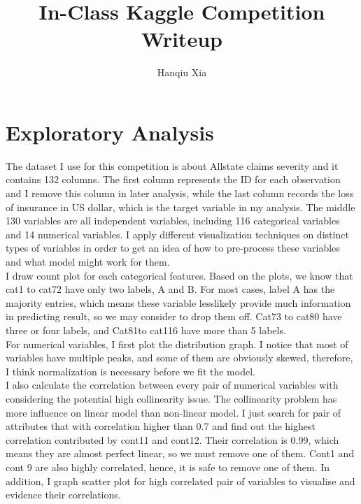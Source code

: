 \documentclass[12pt]{article}
\begin{document}
\title{In-Class Kaggle Competition Writeup}
\author{Hanqiu Xia}

\maketitle

\section{Exploratory Analysis}
The dataset I use for this competition is about Allstate claims severity and it contains 132 columns.  The first column represents the ID for each observation and  I remove this column in later analysis, while the last column records the loss of insurance in US dollar,  which is the target variable in my analysis. The middle 130 variables are all independent variables, including 116 categorical variables and 14 numerical variables. I apply different visualization  techniques on distinct types of variables in order to get an idea of how to pre-process these variables and what model might work for them.  \\

 I draw count plot for each categorical features.  Based on the plots, we know that cat1 to cat72 have only two labels, A and B. For most cases, label A has the majority entries, which means these variable lesslikely provide much information in predicting result, so we may consider to drop them off. Cat73 to cat80 have three or four labels, and Cat81to cat116 have more than 5 labels.\\

For numerical variables, I first plot the distribution graph. I notice that most of variables have multiple peaks, and some of them are obviously skewed, therefore, I think normalization is necessary before we fit the model.\\

I also calculate the correlation between every pair of numerical variables with considering the potential high collinearity issue. The collinearity problem has more influence on linear model than non-linear model. I  just search for pair of attributes that with correlation higher than 0.7 and find out the highest correlation contributed by cont11 and cont12. Their correlation is 0.99, which means they are almost perfect linear, so we must remove one of them. Cont1 and cont 9 are also highly correlated, hence, it is safe to remove one of them.  In addition, I graph scatter plot for high correlated  pair of variables to visualise and evidence their correlations.\\
\end{document}
